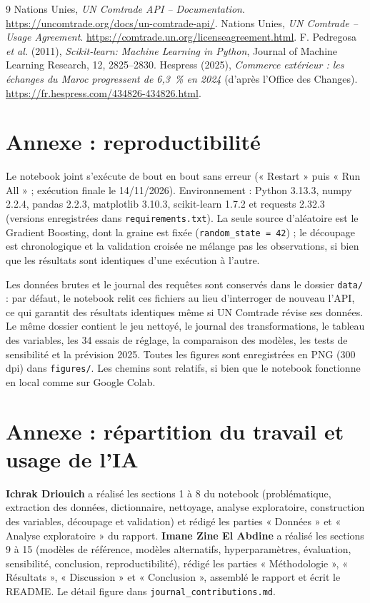 \documentclass[11pt,a4paper]{article}
\begin{document}
\begin{thebibliography}{9}
 Nations Unies, \emph{UN Comtrade API -- Documentation}. \url{https://uncomtrade.org/docs/un-comtrade-api/}.
 Nations Unies, \emph{UN Comtrade -- Usage Agreement}. \url{https://comtrade.un.org/licenseagreement.html}.
 F. Pedregosa \emph{et al.} (2011), \emph{Scikit-learn: Machine Learning in Python}, Journal of Machine Learning Research, 12, 2825--2830.
 Hespress (2025), \emph{Commerce extérieur : les échanges du Maroc progressent de 6,3~\% en 2024} (d'après l'Office des Changes). \url{https://fr.hespress.com/434826-434826.html}.
\end{thebibliography}

\appendix
\section{Annexe : reproductibilité}
Le notebook joint s'exécute de bout en bout sans erreur (« Restart » puis « Run All » ; exécution finale le 14/11/2026). Environnement : Python 3.13.3, numpy 2.2.4, pandas 2.2.3, matplotlib 3.10.3, scikit-learn 1.7.2 et requests 2.32.3 (versions enregistrées dans \texttt{requirements.txt}). La seule source d'aléatoire est le Gradient Boosting, dont la graine est fixée (\texttt{random\_state = 42}) ; le découpage est chronologique et la validation croisée ne mélange pas les observations, si bien que les résultats sont identiques d'une exécution à l'autre.

Les données brutes et le journal des requêtes sont conservés dans le dossier \texttt{data/} : par défaut, le notebook relit ces fichiers au lieu d'interroger de nouveau l'API, ce qui garantit des résultats identiques même si UN Comtrade révise ses données. Le même dossier contient le jeu nettoyé, le journal des transformations, le tableau des variables, les 34 essais de réglage, la comparaison des modèles, les tests de sensibilité et la prévision 2025. Toutes les figures sont enregistrées en PNG (300 dpi) dans \texttt{figures/}. Les chemins sont relatifs, si bien que le notebook fonctionne en local comme sur Google Colab.

\section{Annexe : répartition du travail et usage de l'IA}
\textbf{Ichrak Driouich} a réalisé les sections 1 à 8 du notebook (problématique, extraction des données, dictionnaire, nettoyage, analyse exploratoire, construction des variables, découpage et validation) et rédigé les parties « Données » et « Analyse exploratoire » du rapport.   
\textbf{Imane Zine El Abdine} a réalisé les sections 9 à 15 (modèles de référence, modèles alternatifs, hyperparamètres, évaluation, sensibilité, conclusion, reproductibilité), rédigé les parties « Méthodologie », « Résultats », « Discussion » et « Conclusion », assemblé le rapport et écrit le README. Le détail figure dans \texttt{journal\_contributions.md}.
\end{document}

